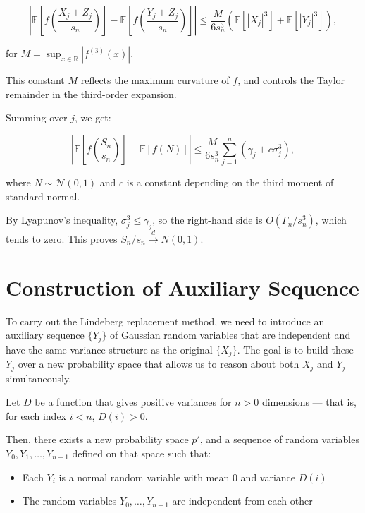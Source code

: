 \[
\left| \mathbb{E}\left[f\left( \frac{X_j + Z_j}{s_n} \right)\right] -
       \mathbb{E}\left[f\left( \frac{Y_j + Z_j}{s_n} \right)\right]
\right| \leq
\frac{M}{6 s_n^3} \left( \mathbb{E}[|X_j|^3] + \mathbb{E}[|Y_j|^3] \right),
\]

for  $M = \sup_{x \in \mathbb{R}} \left| f^{(3)}(x) \right|$.

This constant $M$ reflects the maximum curvature of $f$, and controls the Taylor remainder in the third-order expansion.

Summing over $j$, we get:

\[
\left| \mathbb{E}\left[f\left( \frac{S_n}{s_n} \right) \right] -
       \mathbb{E}[f(N)]
\right| \leq
\frac{M}{6 s_n^3} \sum_{j=1}^n \left( \gamma_j + c \sigma_j^3 \right),
\]

where $N \sim \mathcal{N}(0, 1)$ and $c$ is a constant depending on the third moment of standard normal.

By Lyapunov’s inequality, $\sigma_j^3 \leq \gamma_j$, so the right-hand side is $O(\Gamma_n / s_n^3)$, which tends to zero. This proves $S_n / s_n \xrightarrow{d} N(0,1)$.


\section {Construction of Auxiliary Sequence}

To carry out the Lindeberg replacement method, we need to introduce an auxiliary sequence $\{Y_j\}$ of Gaussian random variables that are independent and have the same variance structure as the original $\{X_j\}$. The goal is to build these $Y_j$ over a new probability space that allows us to reason about both $X_j$ and $Y_j$ simultaneously.

\begin{theorem}
\label{thm:existence-of-indep-vars}
Let $D$ be a function that gives positive variances for $n > 0$ dimensions — that is, for each index $i < n$, $D(i) > 0$.

Then, there exists a new probability space $p'$, and a sequence of random variables $Y_0, Y_1, \dots, Y_{n-1}$ defined on that space such that:
\begin{itemize}
\item Each $Y_i$ is a normal random variable with mean 0 and variance $D(i)$
\item The random variables $Y_0, \dots, Y_{n-1}$ are independent from each other
\end{itemize}
\end{theorem}


